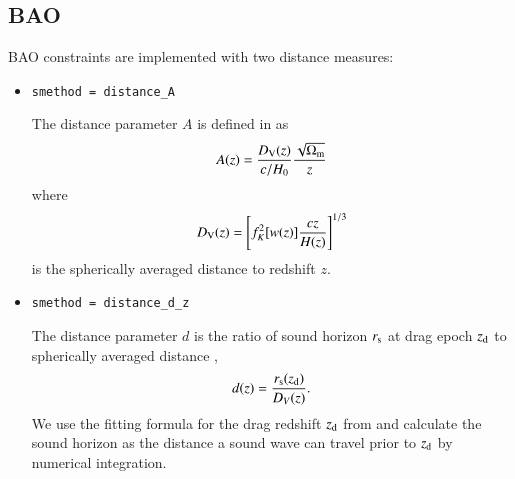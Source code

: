 \documentclass[11pt, chapterprefix, headsepline]{scrartcl}
\begin{document}
\subsection{BAO}

BAO constraints are implemented with two distance measures:


\begin{itemize}

\item \texttt{smethod = distance\_A}

The distance parameter $A$ is defined in
  \cite{2005ApJ...633..560E} as 
\begin{equation}
  A(z) = \frac{D_{\rm V}(z)}{c/H_0} \frac{\sqrt{\Omega_{\rm m}}}{z}
\end{equation}
%
where
%
\begin{equation}
  D_{\rm V}(z) = \left[ f_K^2[w(z)] \frac{c z}{H(z)} \right]^{1/3}
\end{equation}
%
is the spherically averaged distance to redshift $z$.

\item \texttt{smethod = distance\_d\_z}

  The distance parameter $d$ is the ratio of sound horizon $r_{\rm s}$ at
  drag epoch $z_{\rm d}$ to
  spherically averaged distance \citep[e.g.][]{2007MNRAS.381.1053P},
  \begin{equation}
    d(z) = \frac{r_{\rm s}(z_{\rm d})}{D_V(z)}.
  \end{equation}
  We use the fitting formula for the drag redshift $z_{\rm d}$ from
  \citet{1998ApJ...496..605E} and calculate the sound horizon as the distance a sound
  wave can travel prior to $z_{\rm d}$ by numerical integration.

\end{itemize}


%
%
\end{document}

